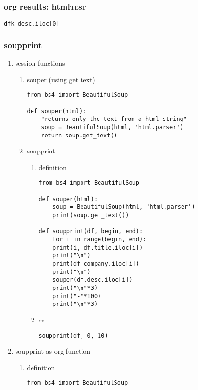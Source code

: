 \documentclass[11pt]{article}
\begin{document}
\subsubsection{org results: html\hfill{}\textsc{test}}
\label{sec:org37a9d13}
\begin{verbatim}
dfk.desc.iloc[0]
\end{verbatim}

\subsubsection{soupprint}
\label{sec:orge1f7a82}
\begin{enumerate}
\item session functions
\label{sec:org1206568}
\begin{enumerate}
\item souper (using get text)
\label{sec:org5942cc6}
\begin{verbatim}
from bs4 import BeautifulSoup

def souper(html):
    "returns only the text from a html string"
    soup = BeautifulSoup(html, 'html.parser')
    return soup.get_text()
\end{verbatim}
\item soupprint
\label{sec:org2ffefe5}
\begin{enumerate}
\item definition
\label{sec:org7bfdb6b}
\begin{verbatim}
from bs4 import BeautifulSoup

def souper(html):
    soup = BeautifulSoup(html, 'html.parser')
    print(soup.get_text())

def soupprint(df, begin, end):
    for i in range(begin, end):
	print(i, df.title.iloc[i])
	print("\n")
	print(df.company.iloc[i])
	print("\n")
	souper(df.desc.iloc[i])
	print("\n"*3)
	print("-"*100)
	print("\n"*3)
\end{verbatim}
\item call
\label{sec:org50f556c}
\begin{verbatim}
soupprint(df, 0, 10)
\end{verbatim}
\end{enumerate}
\end{enumerate}

\item soupprint as org function
\label{sec:org54be24e}
\begin{enumerate}
\item definition
\label{sec:org0cc5a6d}
\begin{verbatim}
from bs4 import BeautifulSoup


\end{verbatim}
\end{enumerate}
\end{enumerate}
\end{document}
